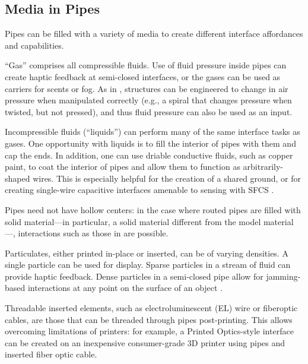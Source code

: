 
\subsection{Media in Pipes}

Pipes can be filled with a variety of media to create different interface affordances and capabilities.

``Gas'' comprises all compressible fluids.  Use of fluid pressure inside pipes can create haptic feedback at semi-closed interfaces, or the gases can be used as carriers for scents or fog.  As in \cite{Slyper-pressure}, structures can be engineered to change in air pressure when manipulated correctly (e.g., a spiral that changes pressure when twisted, but not pressed), and thus fluid pressure can also be used as an input.  

Incompressible fluids (``liquids'') can perform many of the same interface tasks as gases.  One opportunity with liquids is to fill the interior of pipes with them and cap the ends.  In addition, one can use driable conductive fluids, such as copper paint, to coat the interior of pipes and allow them to function as arbitrarily-shaped wires.  This is especially helpful for the creation of a shared ground, or for creating single-wire capacitive interfaces amenable to sensing with SFCS \cite{Sato-touche}.

Pipes need not have hollow centers: in the case where routed pipes are filled with solid material---in particular, a solid material different from the model material---, interactions such as those in \cite{Willis-printedoptics} are possible.

Particulates, either printed in-place or inserted, can be of varying densities.  A single particle can be used for display.  Sparse particles in a stream of fluid can provide haptic feedback.  Dense particles in a semi-closed pipe allow for jamming-based interactions at any point on the surface of an object \cite{Follmer-jamming}.

Threadable inserted elements, such as electroluminescent (EL) wire or fiberoptic cables, are those that can be threaded through pipes post-printing.  This allows overcoming limitations of printers: for example, a Printed Optics-style interface can be created on an inexpensive consumer-grade 3D printer using pipes and inserted fiber optic cable.


